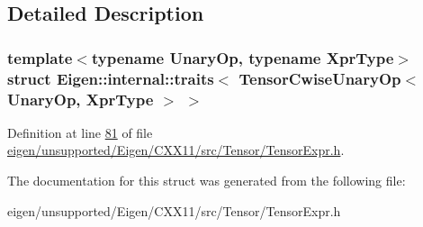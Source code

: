 \subsection{Detailed Description}
\subsubsection*{template$<$typename Unary\+Op, typename Xpr\+Type$>$\newline
struct Eigen\+::internal\+::traits$<$ Tensor\+Cwise\+Unary\+Op$<$ Unary\+Op, Xpr\+Type $>$ $>$}



Definition at line \hyperlink{eigen_2unsupported_2_eigen_2_c_x_x11_2src_2_tensor_2_tensor_expr_8h_source_l00081}{81} of file \hyperlink{eigen_2unsupported_2_eigen_2_c_x_x11_2src_2_tensor_2_tensor_expr_8h_source}{eigen/unsupported/\+Eigen/\+C\+X\+X11/src/\+Tensor/\+Tensor\+Expr.\+h}.



The documentation for this struct was generated from the following file\+:\begin{DoxyCompactItemize}
\item 
eigen/unsupported/\+Eigen/\+C\+X\+X11/src/\+Tensor/\+Tensor\+Expr.\+h\end{DoxyCompactItemize}
